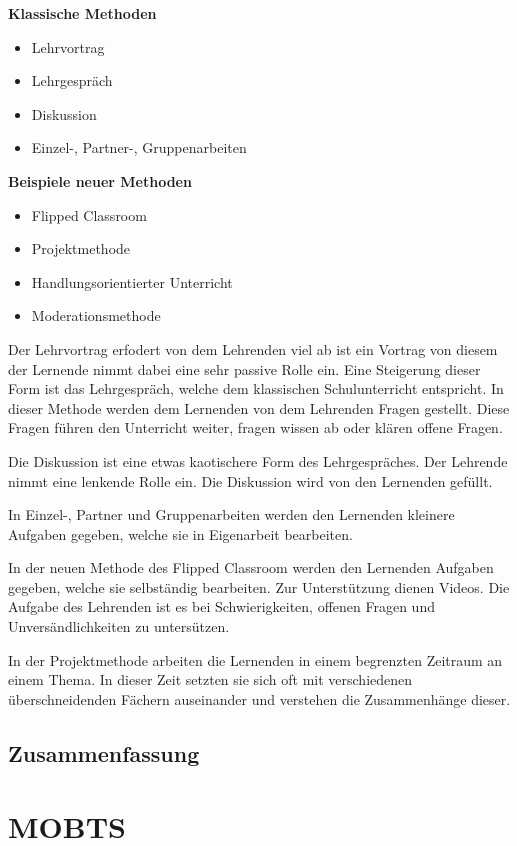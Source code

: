  \textbf{Klassische Methoden}
 \begin{itemize}
     \item Lehrvortrag
     \item Lehrgespräch
     \item Diskussion
     \item Einzel-, Partner-, Gruppenarbeiten
 \end{itemize}
 \textbf{Beispiele neuer Methoden}
\begin{itemize}
    \item Flipped Classroom
    \item Projektmethode
    \item Handlungsorientierter Unterricht
    \item Moderationsmethode
\end{itemize}

Der Lehrvortrag erfodert von dem Lehrenden viel ab ist ein Vortrag von diesem der Lernende nimmt dabei eine sehr passive Rolle ein. Eine Steigerung dieser Form ist das Lehrgespräch, welche dem klassischen Schulunterricht entspricht. In dieser Methode werden dem Lernenden von dem Lehrenden Fragen gestellt. Diese Fragen führen den Unterricht weiter, fragen wissen ab oder klären offene Fragen. 

Die Diskussion ist eine etwas kaotischere Form des Lehrgespräches. Der Lehrende nimmt eine lenkende Rolle ein. Die Diskussion wird von den Lernenden gefüllt. 

In Einzel-, Partner und Gruppenarbeiten werden den Lernenden kleinere Aufgaben gegeben, welche sie in Eigenarbeit bearbeiten. 

In der neuen Methode des Flipped Classroom werden den Lernenden Aufgaben gegeben, welche sie selbständig bearbeiten. Zur Unterstützung dienen Videos. Die Aufgabe des Lehrenden ist es bei Schwierigkeiten, offenen Fragen und Unversändlichkeiten zu untersützen. 

In der Projektmethode arbeiten die Lernenden in einem begrenzten Zeitraum an einem Thema. In dieser Zeit setzten sie sich oft mit verschiedenen überschneidenden Fächern auseinander und verstehen die Zusammenhänge dieser. 

\subsection{Zusammenfassung}


\section{\ac{MOBTS}}


